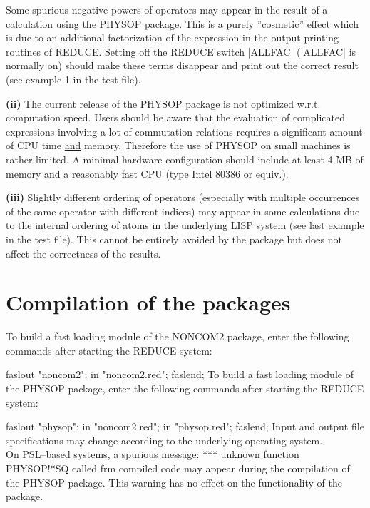  Some spurious negative powers  of operators
may appear
in the result of a calculation using the PHYSOP package. This is a
purely ''cosmetic'' effect which is due to an additional
factorization of the expression in the output printing routines of
REDUCE. Setting off the REDUCE switch |ALLFAC|  (|ALLFAC| is normally on)
should make these
terms disappear and print out the correct result (see example 1
in the test file).

{\bf (ii)} The current release of the PHYSOP package is not optimized
w.r.t. computation speed. Users should be aware that the evaluation
of complicated expressions involving a lot of commutation relations
requires a significant amount of CPU time \underline{and} memory.
Therefore the use of PHYSOP on small machines is rather limited. A
minimal hardware configuration should include at least 4 MB of
memory and a reasonably fast CPU (type Intel 80386 or equiv.).

{\bf (iii)} Slightly different ordering of operators (especially with
multiple occurrences of the same operator with different indices)
may appear in some calculations
due to the internal ordering of atoms in the underlying LISP system
(see last example in the test file). This cannot be entirely avoided
by the package but does not affect the correctness  of the results.

\section{Compilation of the packages}
To build a fast loading module of the NONCOM2 package, enter the
following commands after starting the REDUCE system:

\begintt
  faslout "noncom2";
   in "noncom2.red";
  faslend;
\endtt
To build a fast loading module of the PHYSOP package, enter the
following commands after starting the REDUCE system:

\begintt
  faslout "physop";
   in "noncom2.red";
   in "physop.red";
  faslend;
\endtt
Input and output file specifications may change according to the
underlying operating system. \\
On PSL--based systems, a spurious message:
\begintt
*** unknown function PHYSOP!*SQ called frm compiled code
\endtt
may appear during the compilation of the PHYSOP package. This warning
has no effect on the functionality of the package.


